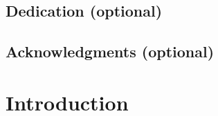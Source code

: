\documentclass[11pt, oneside]{book}
\begin{document}
\newpage
\section*{Dedication (optional)}
\lipsum[2-3]


\newpage
\section*{Acknowledgments (optional)}
\lipsum[4]

\setcounter{tocdepth}{1}
\tableofcontents

\listoftables

\listoffigures
\mainmatter
\hypertarget{introduction}{%
\chapter{Introduction}\label{introduction}}
\end{document}
